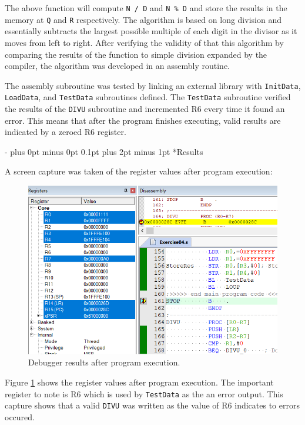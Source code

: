 \documentclass[\FontSize\FontUnit,letterpaper,oneside]{article}
\makeatletter
\def\code#1{\texttt{#1}}
\renewcommand \section{
    \@startsection{section}{1}{\z@}
      {\dimexpr \FontSize\FontUnit * 2 - \parskip \relax plus 0pt minus 0pt}
      {0.1pt plus 2pt minus 1pt} %
      {\normalfont\normalsize\bfseries}}
\makeatother
\begin{document}
The above function will compute \code{N / D} and \code{N \% D} and store
the results in the memory at \code{Q} and \code{R} respectively. The
algorithm is based on long division and essentially subtracts the largest
possible multiple of each digit in the divisor as it moves from left to
right. After verifying the validity of that this algorithm by comparing 
the results of the function to simple division expanded by the compiler, 
the algorithm was developed in an assembly routine.

The assembly subroutine was tested by linking an external library with
\code{InitData}, \code{LoadData}, and \code{TestData} subroutines defined.
The \code{TestData} subroutine verified the results of the \code{DIVU} 
subroutine and incremented R6 every time it found an error. This means
that after the program finishes executing, valid results are indicated
by a zeroed R6 register.

\section*{Results}

A screen capture was taken of the register values after program execution:

\begin{figure}[h!]
	\centering
	\includegraphics[width=\textwidth]{cap1}
	\caption{Debugger results after program execution.}
	\label{fig:capture1}
\end{figure}

Figure \ref{fig:capture1} shows the register values after program execution.
The important register to note is R6 which is used by \code{TestData} as
the an error output. This capture shows that a valid \code{DIVU} was written
as the value of R6 indicates to errors occured.
\pagebreak
\end{document}
